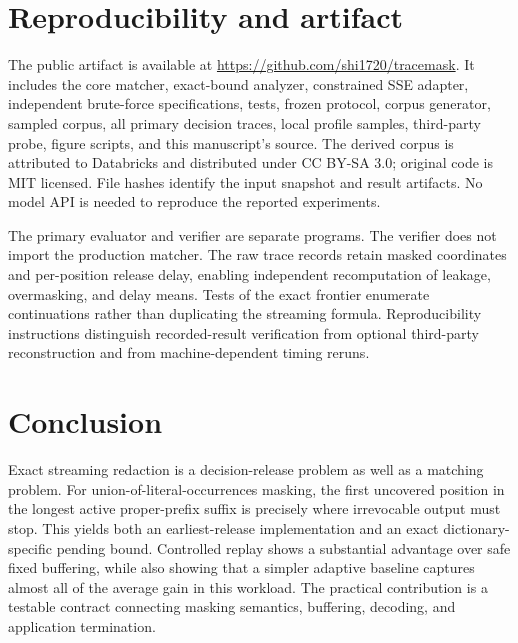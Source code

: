 \documentclass[11pt,a4paper]{article}
\begin{document}
\section{Reproducibility and artifact}
The public artifact is available at \url{https://github.com/shi1720/tracemask}. It includes the core matcher, exact-bound analyzer, constrained SSE adapter, independent brute-force specifications, tests, frozen protocol, corpus generator, sampled corpus, all primary decision traces, local profile samples, third-party probe, figure scripts, and this manuscript's source. The derived corpus is attributed to Databricks and distributed under CC BY-SA 3.0; original code is MIT licensed. File hashes identify the input snapshot and result artifacts. No model API is needed to reproduce the reported experiments.

The primary evaluator and verifier are separate programs. The verifier does not import the production matcher. The raw trace records retain masked coordinates and per-position release delay, enabling independent recomputation of leakage, overmasking, and delay means. Tests of the exact frontier enumerate continuations rather than duplicating the streaming formula. Reproducibility instructions distinguish recorded-result verification from optional third-party reconstruction and from machine-dependent timing reruns.

\section{Conclusion}
Exact streaming redaction is a decision-release problem as well as a matching problem. For union-of-literal-occurrences masking, the first uncovered position in the longest active proper-prefix suffix is precisely where irrevocable output must stop. This yields both an earliest-release implementation and an exact dictionary-specific pending bound. Controlled replay shows a substantial advantage over safe fixed buffering, while also showing that a simpler adaptive baseline captures almost all of the average gain in this workload. The practical contribution is a testable contract connecting masking semantics, buffering, decoding, and application termination.
\end{document}
